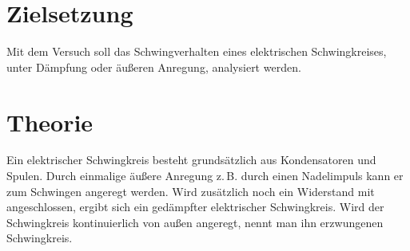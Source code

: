 \setcounter{page}{1}

\section*{Zielsetzung}
Mit dem Versuch soll das Schwingverhalten eines elektrischen Schwingkreises,
unter Dämpfung oder äußeren Anregung, analysiert werden.


\section{Theorie}
Ein elektrischer Schwingkreis besteht grundsätzlich
aus Kondensatoren und Spulen. %
Durch einmalige äußere Anregung z.\,B. durch einen Nadelimpuls %
kann er zum Schwingen angeregt werden.  %
Wird zusätzlich noch ein Widerstand mit angeschlossen, ergibt sich ein
gedämpfter elektrischer Schwingkreis. %
Wird der Schwingkreis kontinuierlich von außen angeregt, nennt man
ihn erzwungenen Schwingkreis.

